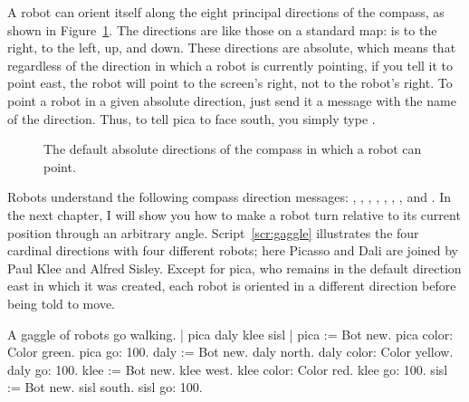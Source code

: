 \documentclass[a4paper,10pt,twoside]{book}
\begin{document}
A robot can orient itself along the eight principal directions of the compass, as shown in 
Figure~\ref{fig:roseDesVents}. The directions are like those on a standard map:  is to the right,  to the left,  up, and  down. These directions are absolute, which means that regardless of the  direction in which a robot is currently pointing, if you tell it to point east, the robot will point to the screen’s right, not to the robot’s right. To point a robot in a given absolute direction, just send it a message with the name of the direction. Thus, to tell pica to face south, you simply 
type . 

\begin{figure}
\caption{The default absolute directions of the compass in which a robot can point. 
\label{fig:roseDesVents}}
\end{figure}

Robots understand the following compass direction messages: , , , 
, , , , and . In the next chapter, I will show you how to make a robot turn relative to its current position through an arbitrary angle. 
Script~\ref{scr:gaggle} illustrates the four cardinal directions with four different robots; here Picasso 
and Dali are joined by Paul Klee and Alfred Sisley. Except for pica, who remains in the default 
direction east in which it was created, each robot is oriented in a different direction before 
being told to move. 


\begin{script}[gaggle]{A gaggle of robots go walking.}
| pica daly klee sisl | 
pica := Bot new. 
pica color: Color green. 
pica go: 100. 
daly := Bot new. 
daly north. 
daly color: Color yellow. 
daly go: 100. 
klee := Bot new. 
klee west. 
klee color: Color red. 
klee go: 100. 
sisl := Bot new. 
sisl south. 
sisl go: 100. 
\end{script}
\end{document}
